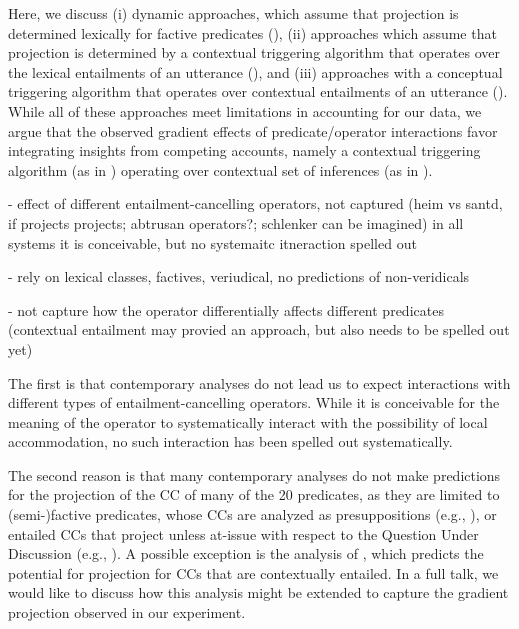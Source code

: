 \documentclass[a4paper,12pt,twoside]{article}
\begin{document}
	Here, we discuss (i) dynamic approaches, which assume that projection is determined lexically for factive predicates (\citealt{heim_projection_1983,heim_presupposition_1992,van_der_sandt_presupposition_1992}), (ii) approaches which assume that projection is determined by a contextual triggering algorithm that operates over the lexical entailments of an utterance (\citealt{abrusan_predicting_2011,simons_best_2017}), and (iii) approaches with a conceptual triggering algorithm that operates over contextual entailments of an utterance (\citealt{schlenker_triggering_2021}). While all of these approaches meet limitations in accounting for our data, we argue that the observed gradient effects of predicate/operator interactions favor integrating insights from competing accounts, namely a contextual triggering algorithm (as in \citealt{abrusan_predicting_2011,simons_best_2017}) operating over contextual set of inferences (as in \citealt{schlenker_triggering_2021}).

	- effect of different entailment-cancelling operators, not captured (heim vs santd, if projects projects; abtrusan operators?; schlenker can be imagined) in all systems it is conceivable, but no systemaitc itneraction spelled out


	- rely on lexical classes, factives, veriudical, no predictions of non-veridicals

	- not capture how the operator differentially affects different predicates (contextual entailment may provied an approach, but also needs to be spelled out yet)

	The first is that contemporary analyses do not lead us to expect interactions with different types of entailment-cancelling operators. While it is conceivable for the meaning of the operator to systematically interact with the possibility of local accommodation, no such interaction has been spelled out systematically.

	
	The second reason is that many contemporary analyses do not make predictions for the projection of the CC of many of the 20 predicates, as they are limited to (semi-)factive predicates, whose CCs are analyzed as presuppositions (e.g., \citealt{heim_projection_1983,van_der_sandt_presupposition_1992}), or entailed CCs that project unless at-issue with respect to the Question Under Discussion (e.g., \citealt{abrusan_predicting_2011,simons_best_2017}). A possible exception is the analysis of \citealt{schlenker_triggering_2021}, which predicts the potential for projection for CCs that are contextually entailed. In a full talk, we would like to discuss how this analysis might be extended to capture the gradient projection observed in our experiment.
	
\end{document}
